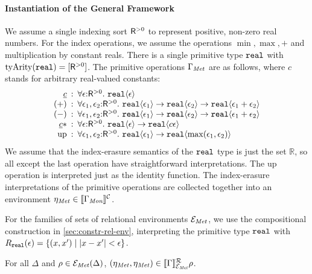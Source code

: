 \paragraph{Instantiation of the General Framework}
We assume a single indexing sort $\mathsf{R}^{>0}$ %
to represent positive, non-zero real numbers. For the index
operations, we assume the operations $\min, \max, +$ and
multiplication by constant reals. There is a single primitive type
$\textup{\texttt{real}}$ with $\mathrm{tyArity}(\textup{\texttt{real}}) =
[\mathsf{R}^{>0}]$. The primitive operations $\Gamma_{\mathit{Met}}$ are as
follows, where $c$ stands for arbitrary real-valued constants:
\begin{displaymath}
  \begin{array}{r@{\hspace{0.5em}:\hspace{0.5em}}l}
    \underline{c} & \forall \epsilon\mathord:\metricSort.\ \tyPrim{real}{\epsilon} \\
    (+) & \forall \epsilon_1, \epsilon_2\mathord:\metricSort.\ \tyPrim{real}{\epsilon_1} \to \tyPrim{real}{\epsilon_2} \to \tyPrim{real}{\epsilon_1 + \epsilon_2} \\
    (-) & \forall \epsilon_1, \epsilon_2\mathord:\metricSort.\ \tyPrim{real}{\epsilon_1} \to \tyPrim{real}{\epsilon_2} \to \tyPrim{real}{\epsilon_1 + \epsilon_2} \\
    \underline{c} * & \forall \epsilon\mathord:\metricSort.\ \tyPrim{real}{\epsilon} \to \tyPrim{real}{c\epsilon} \\
    \mathrm{up} & \forall \epsilon_1,\epsilon_2\mathord:\metricSort.\ \tyPrim{real}{\epsilon_1} \to \tyPrim{real}{\max(\epsilon_1,\epsilon_2)}
  \end{array}
\end{displaymath}
We assume that the index-erasure semantics of the $\textup{\texttt{real}}$
type is just the set $\mathbb{R}$, so all except the last operation
have straightforward interpretations. The $\mathrm{up}$ operation is
interpreted just as the identity function. The index-erasure
interpretations of the primitive operations are collected together
into an environment $\eta_{\mathit{Met}} \in \llbracket \Gamma_{\textit{Mon}} \rrbracket^{\mathcal{C}}$.

For the families of sets of relational environments
$\mathcal{E}_{\mathit{Met}}$, we use the compositional construction in
\autoref{sec:constr-rel-env}, interpreting the primitive type
$\textup{\texttt{real}}$ with $R_{\textup{\texttt{real}}}(\epsilon) = \{ (x,x')
\mathrel| |x - x'| < \epsilon\}$.
\begin{lemma}
  For all $\Delta$ and $\rho \in \mathcal{E}_{\mathit{Met}}(\Delta)$,
  $(\eta_{\mathit{Met}}, \eta_{\mathit{Met}}) \in
  \llbracket \Gamma \rrbracket^{\mathcal{R}}_{\mathcal{E}_{\mathit{Met}}}{\rho}$.
\end{lemma}

